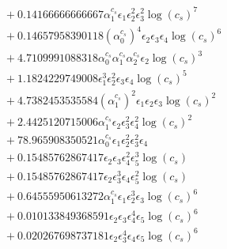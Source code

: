 \documentclass[10pt]{article}
\begin{document}
\begin{align*}
&{}  + 0.14166666666667 \alpha_{1}^{c_s} \epsilon_{1} \epsilon_{2}^{2} \epsilon_{3}^{2} \log{\left(c_{s} \right)}^{7} \\
&{}  + 0.14657958390118 \left(\alpha_{0}^{c_s}\right)^{4} \epsilon_{2} \epsilon_{3} \epsilon_{4} \log{\left(c_{s} \right)}^{6} \\
&{}  + 4.7109991088318 \alpha_{0}^{c_s} \alpha_{1}^{c_s} \alpha_{2}^{c_s} \epsilon_{2} \log{\left(c_{s} \right)}^{3} \\
&{}  + 1.1824229749008 \epsilon_{1}^{3} \epsilon_{2}^{2} \epsilon_{3} \epsilon_{4} \log{\left(c_{s} \right)}^{5} \\
&{}  + 4.7382453535584 \left(\alpha_{1}^{c_s}\right)^{2} \epsilon_{1} \epsilon_{2} \epsilon_{3} \log{\left(c_{s} \right)}^{2} \\
&{}  + 2.4425120715006 \alpha_{1}^{c_s} \epsilon_{2} \epsilon_{3}^{2} \epsilon_{4}^{2} \log{\left(c_{s} \right)}^{2} \\
&{}  + 78.965908350521 \alpha_{0}^{c_s} \epsilon_{1} \epsilon_{2}^{2} \epsilon_{3}^{2} \epsilon_{4} \\
&{}  + 0.15485762867417 \epsilon_{2} \epsilon_{3} \epsilon_{4}^{2} \epsilon_{5}^{3} \log{\left(c_{s} \right)} \\
&{}  + 0.15485762867417 \epsilon_{2} \epsilon_{3}^{3} \epsilon_{4} \epsilon_{5}^{2} \log{\left(c_{s} \right)} \\
&{}  + 0.64555950613272 \alpha_{1}^{c_s} \epsilon_{1} \epsilon_{2}^{3} \epsilon_{3} \log{\left(c_{s} \right)}^{6} \\
&{}  + 0.010133849368591 \epsilon_{2} \epsilon_{3} \epsilon_{4}^{4} \epsilon_{5} \log{\left(c_{s} \right)}^{6} \\
&{}  + 0.020267698737181 \epsilon_{2} \epsilon_{3}^{4} \epsilon_{4} \epsilon_{5} \log{\left(c_{s} \right)}^{6}
\end{align*}
\end{document}
